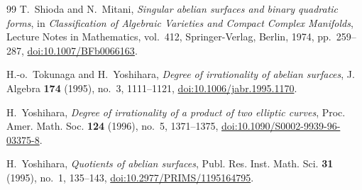 \documentclass[12pt]{amsart}
\numberwithin{equation}{section}
\theoremstyle{definition}
\theoremstyle{remark}
\begin{document}
\begin{thebibliography}{99}
T.~Shioda and N.~Mitani,
\emph{Singular abelian surfaces and binary quadratic forms},
in \emph{Classification of Algebraic Varieties and Compact Complex
Manifolds}, Lecture Notes in Mathematics, vol.~412,
Springer-Verlag, Berlin, 1974, pp.~259--287,
\href{https://doi.org/10.1007/BFb0066163}
{doi:10.1007/BFb0066163}.

H.-o.~Tokunaga and H.~Yoshihara,
\emph{Degree of irrationality of abelian surfaces},
J. Algebra \textbf{174} (1995), no.~3, 1111--1121,
\href{https://doi.org/10.1006/jabr.1995.1170}
{doi:10.1006/jabr.1995.1170}.

H.~Yoshihara,
\emph{Degree of irrationality of a product of two elliptic curves},
Proc. Amer. Math. Soc. \textbf{124} (1996), no.~5, 1371--1375,
\href{https://doi.org/10.1090/S0002-9939-96-03375-8}
{doi:10.1090/S0002-9939-96-03375-8}.

H.~Yoshihara,
\emph{Quotients of abelian surfaces},
Publ. Res. Inst. Math. Sci. \textbf{31} (1995), no.~1, 135--143,
\href{https://doi.org/10.2977/PRIMS/1195164795}
{doi:10.2977/PRIMS/1195164795}.

\end{thebibliography}
\end{document}

